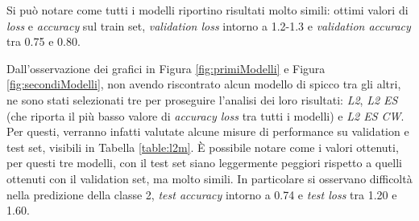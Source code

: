 Si può notare come tutti i modelli riportino risultati molto simili: ottimi valori di \textit{loss} e \textit{accuracy} sul train set, \textit{validation loss} intorno a 1.2-1.3 e \textit{validation accuracy} tra 0.75 e 0.80.

\begin{table}[h!]
\centering
{}
    \caption{Risultati all'ultima epoca su Train e Validation set}
    \label{tab:xxx}
\end{table}

Dall'osservazione dei grafici in Figura \ref{fig:primiModelli} e Figura \ref{fig:secondiModelli}, non avendo riscontrato alcun modello di spicco tra gli altri, ne sono stati selezionati tre per proseguire l'analisi dei loro risultati: \textit{L2}, \textit{L2 ES} (che riporta il più basso valore di \textit{accuracy loss} tra tutti i modelli) e \textit{L2 ES CW}.
Per questi, verranno infatti valutate alcune misure di performance su validation e test set, visibili in Tabella \ref{table:l2m}. 
È possibile notare come i valori ottenuti, per questi tre modelli, con il test set siano leggermente peggiori rispetto a quelli ottenuti con il validation set, ma molto simili. 
In particolare si osservano difficoltà nella predizione della classe 2, \textit{test accuracy} intorno a 0.74 e \textit{test loss} tra 1.20 e 1.60.

